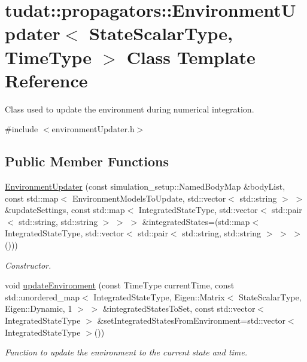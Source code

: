 \hypertarget{classtudat_1_1propagators_1_1EnvironmentUpdater}{}\section{tudat\+:\+:propagators\+:\+:Environment\+Updater$<$ State\+Scalar\+Type, Time\+Type $>$ Class Template Reference}
\label{classtudat_1_1propagators_1_1EnvironmentUpdater}


Class used to update the environment during numerical integration.  




{\ttfamily \#include $<$environment\+Updater.\+h$>$}

\subsection*{Public Member Functions}
\begin{DoxyCompactItemize}
\item 
\hyperlink{classtudat_1_1propagators_1_1EnvironmentUpdater_adf988e03317fa424c953e4df3f484d46}{Environment\+Updater} (const simulation\+\_\+setup\+::\+Named\+Body\+Map \&body\+List, const std\+::map$<$ Environment\+Models\+To\+Update, std\+::vector$<$ std\+::string $>$ $>$ \&update\+Settings, const std\+::map$<$ Integrated\+State\+Type, std\+::vector$<$ std\+::pair$<$ std\+::string, std\+::string $>$ $>$ $>$ \&integrated\+States=(std\+::map$<$ Integrated\+State\+Type, std\+::vector$<$ std\+::pair$<$ std\+::string, std\+::string $>$ $>$ $>$()))
\begin{DoxyCompactList}\small\item\em Constructor. \end{DoxyCompactList}\item 
void \hyperlink{classtudat_1_1propagators_1_1EnvironmentUpdater_a47305468e6755830c457070a30c5b68b}{update\+Environment} (const Time\+Type current\+Time, const std\+::unordered\+\_\+map$<$ Integrated\+State\+Type, Eigen\+::\+Matrix$<$ State\+Scalar\+Type, Eigen\+::\+Dynamic, 1 $>$ $>$ \&integrated\+States\+To\+Set, const std\+::vector$<$ Integrated\+State\+Type $>$ \&set\+Integrated\+States\+From\+Environment=std\+::vector$<$ Integrated\+State\+Type $>$())
\begin{DoxyCompactList}\small\item\em Function to update the environment to the current state and time. \end{DoxyCompactList}\end{DoxyCompactItemize}



